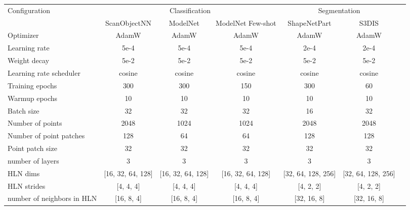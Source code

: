 \begin{table*}
\footnotesize
\setlength{\tabcolsep}{3.3mm}
\begin{tabular}{lcccccc}
\toprule
    \multirow{2}{*}{Configuration}  &\multicolumn{3}{c}{Classification} & \multicolumn{2}{c}{Segmentation}\\
		\cmidrule(r){2-4} \cmidrule(r){5-6}
	 &ScanObjectNN & ModelNet & ModelNet Few-shot & ShapeNetPart & S3DIS     \\
    \midrule
 Optimizer & AdamW & AdamW & AdamW & AdamW & AdamW \\
 Learning rate & 5e-4 & 5e-4 & 5e-4  & 2e-4 & 2e-4 \\
 Weight decay & 5e-2 & 5e-2 & 5e-2 & 5e-2  & 5e-2 \\
 Learning rate scheduler & cosine & cosine & cosine & cosine & cosine \\
 Training epochs  & 300 & 300 & 150 & 300 & 60 \\
 Warmup epochs& 10 & 10& 10 & 10 &10 \\
 Batch size & 32 & 32& 32 & 16 & 32 \\
 \midrule
 Number of points  & 2048 & 1024& 1024 & 2048 & 2048 \\
 Number of point patches & 128 & 64 & 64 & 128 & 128\\
 Point patch size  & 32 & 32 & 32  & 32 & 32 \\
 \midrule
 number of layers & 3 & 3 & 3 & 3 & 3\\
 HLN dims & [16, 32, 64, 128] & [16, 32, 64, 128] & [16, 32, 64, 128] & [32, 64, 128, 256] & [32, 64, 128, 256]\\
 HLN strides & [4, 4, 4] & [4, 4, 4] & [4, 4, 4] & [4, 2, 2] & [4, 2, 2]\\
 number of neighbors in HLN & [16, 8, 4] & [16, 8, 4] & [16, 8, 4] & [32, 16, 8] & [32, 16, 8] \\
\bottomrule
\end{tabular}
\label{tab:paramas}
\end{table*}